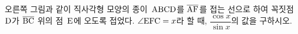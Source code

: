 \noindent\begin{minipage}[t]{0.58\linewidth}\vspace{0pt}\raggedright 오른쪽 그림과 같이 직사각형 모양의 종이~$\mathrm{ABCD}$를 $\overline{\mathrm{AF}}$를 접는 선으로 하여 꼭짓점~$\mathrm{D}$가 $\overline{\mathrm{BC}}$ 위의 점~$\mathrm{E}$에 오도록 접었다. $\angle\mathrm{EFC}=x$라 할 때, $\dfrac{\cos x}{\sin x}$의 값을 구하시오.\end{minipage}\hfill\begin{minipage}[t]{0.4\linewidth}\vspace{0pt}\centering \resizebox{\ifdim\width>\linewidth\linewidth\else\width\fi}{!}{}\end{minipage}\par
